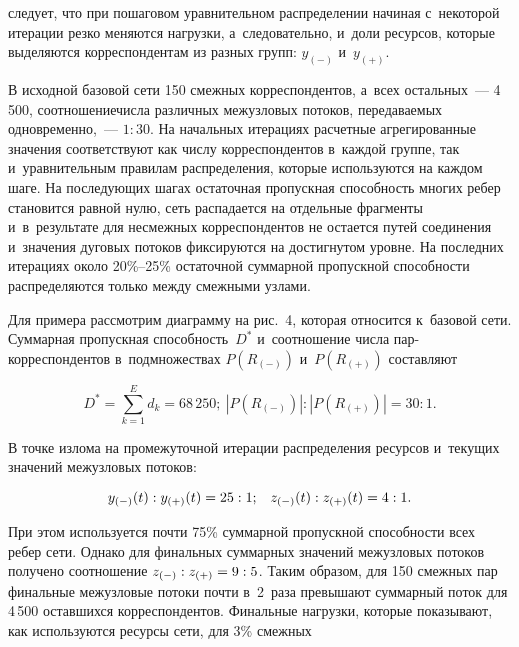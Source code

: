 \begin{multicols}{2}

\noindent
 следует,
 что  при пошаговом уравнительном 
распределении  начиная с~некоторой итерации резко меняются нагрузки, 
а~следовательно, и~доли ресурсов, которые выделяются корреспондентам из разных 
групп: $y_{(-)}$ и~$y_{(+)}$.



В исходной базовой сети 150 смежных корреспондентов, а~всех остальных~--- 
4\,500, соотношение\linebreak  числа  различных межузловых потоков, пе\-ре\-да\-ва\-емых 
одновременно,~--- $1:30$.
На начальных итерациях расчетные агрегированные значения соответствуют как  
числу корреспондентов в~каждой \mbox{группе}, так и~уравнительным правилам 
распределения, которые используются на каждом шаге.  На последующих шагах  
остаточная пропускная спо\-соб\-ность многих  ребер становится равной нулю, сеть 
распадается на отдельные фрагменты и~в~результате для не\-смеж\-ных  
корреспондентов не остается путей со\-еди\-не\-ния и~значения  дуговых потоков 
фик\-си\-ру\-ют\-ся на достигнутом уровне. На последних итерациях  около 
20\%--25\% остаточной суммарной про\-пуск\-ной спо\-соб\-ности распределяются только 
между смеж\-ны\-ми узлами.

Для примера рассмотрим диаграмму на рис.~4, которая относится к~базовой сети. 
Суммарная пропускная спо\-соб\-ность~$D^*$ и~соотношение чис\-ла пар-кор\-рес\-пон\-ден\-тов 
в~подмножествах $P(R_{(-)})$ и~$P(R_{(+)})$ со\-став\-ляют

\noindent
$$ 
D^* = \sum\limits_{k = 1}^{E} d_k = 68\,250; \  |P(R_{(-)})| : 
|P(R_{(+)})| = 30:1.
$$

\vspace*{-2pt}

\noindent
В точке излома на промежуточной итерации распределения ресурсов и~текущих 
значений межузловых потоков:

\noindent
$$ 
y_{(-)}(t) : y_{(+)}(t) = 25:1;   \enskip \ z_{(-)}(t) : z_{(+)}(t) = 4:1.
$$

\vspace*{-2pt}

\noindent
При этом используется почти 75\% суммарной пропускной способности всех ребер 
сети. Однако для финальных  суммарных значений межузловых потоков  получено 
соотношение $z_{(-)} : z_{(+)} \hm= 9:5$. Таким образом, для 150 смежных пар 
финальные межузловые потоки почти в~2~раза превышают суммарный поток для 
4\,500 оставшихся корреспондентов. Финальные нагрузки, которые показывают, 
как используются  ресурсы сети, для 3\% смежных\linebreak\vspace*{-12pt}


\end{multicols}
